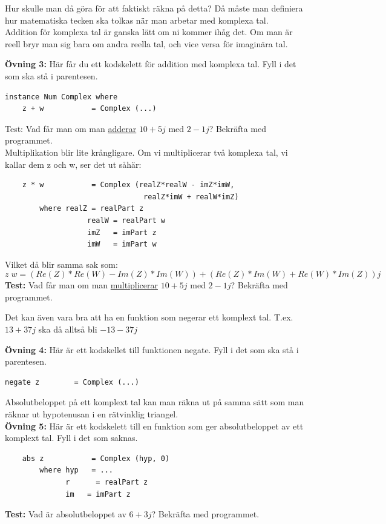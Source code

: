 \documentclass{article}
\begin{document}
Hur skulle man då göra för att faktiskt räkna på detta? Då måste man definiera hur matematiska tecken ska tolkas när man arbetar med komplexa tal.\\

Addition för komplexa tal är ganska lätt om ni kommer ihåg det. Om man är reell bryr man sig bara om andra reella tal, och vice versa för imaginära tal. 

\textbf{Övning 3:} Här får du ett kodskelett för addition med komplexa tal. Fyll i det som ska stå i parentesen.
\begin{verbatim}
instance Num Complex where
    z + w           = Complex (...)
\end{verbatim}
Test: Vad får man om man \underline{adderar} $10 + 5j$ med $2 -1j$? Bekräfta med programmet.\\

Multiplikation blir lite krångligare. Om vi multiplicerar två komplexa tal, vi kallar dem z och w, ser det ut såhär:
\begin{verbatim}
    z * w           = Complex (realZ*realW - imZ*imW, 
                                realZ*imW + realW*imZ)
        where realZ = realPart z
                   realW = realPart w
                   imZ   = imPart z
                   imW   = imPart w
\end{verbatim}
Vilket då blir samma sak som:
$$z \; w = (Re(Z) * Re(W) - Im(Z)*Im(W)) + (Re(Z)*Im(W) + Re(W)*Im(Z))j$$
\textbf{Test:} Vad får man om man \underline{multiplicerar} $10 + 5j$ med $2 -1j$? Bekräfta med programmet.

Det kan även vara bra att ha en funktion som negerar ett komplext tal. T.ex. $13+37j$ ska då alltså bli $-13-37j$

\textbf{Övning 4:} Här är ett kodskellet till funktionen negate. Fyll i det som ska stå i parentesen.
\begin{verbatim}
negate z        = Complex (...)
\end{verbatim}
Absolutbeloppet på ett komplext tal kan man räkna ut på samma sätt som man räknar ut hypotenusan i en rätvinklig triangel.\\

\textbf{Övning 5:} Här är ett kodskelett till en funktion som ger absolutbeloppet av ett komplext tal. Fyll i det som saknas.
\begin{verbatim}
    abs z           = Complex (hyp, 0)
        where hyp   = ...
              r      = realPart z
              im   = imPart z
\end{verbatim}
\textbf{Test:} Vad är absolutbeloppet av $6 + 3j$? Bekräfta med programmet.
\end{document}
